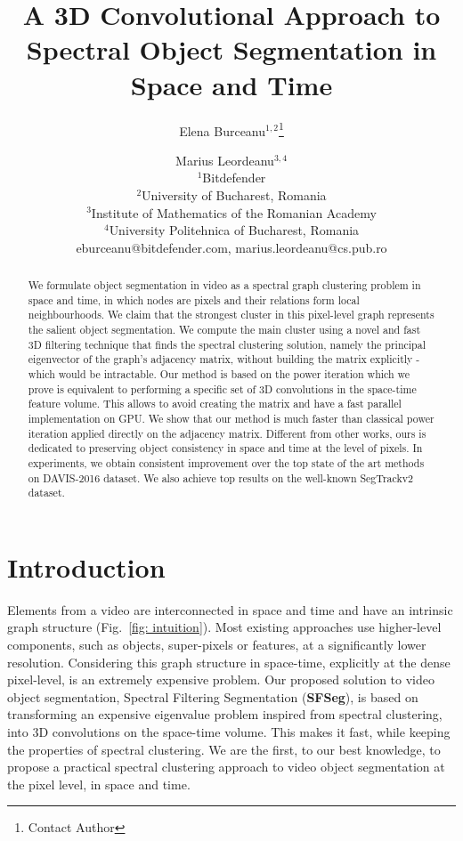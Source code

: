 \documentclass{article}
\title{A 3D Convolutional Approach to Spectral Object Segmentation in Space and Time}
\author{
Elena Burceanu$^{1,2}$\footnote{Contact Author}\and
Marius Leordeanu$^{3, 4}$\\
\affiliations
$^1$Bitdefender\\
$^2$University of Bucharest, Romania\\
$^3$Institute of Mathematics of the Romanian Academy\\
$^4$University Politehnica of Bucharest, Romania\\
\emails
eburceanu@bitdefender.com,
marius.leordeanu@cs.pub.ro
}
\begin{document}
\maketitle

\begin{abstract}
We formulate object segmentation in video as a spectral graph clustering problem in space and time, in which nodes are pixels and their relations form local neighbourhoods. We claim that the strongest cluster in this pixel-level graph represents the salient object segmentation. We compute the main cluster using a novel and fast 3D filtering technique that finds the spectral clustering solution, namely the principal eigenvector of the graph's adjacency matrix, without building the matrix explicitly - which would be intractable. Our method is based on the power iteration which we prove is equivalent to performing a specific set of 3D convolutions in the space-time feature volume. This allows to avoid creating the matrix and have a fast parallel implementation on GPU. We show that our method is much faster than classical power iteration applied directly on the adjacency matrix. Different from other works, ours is dedicated to preserving object consistency in space and time at the level of pixels. 
In experiments, we obtain consistent improvement over the top state of the art methods on DAVIS-2016 dataset. We also achieve top results on the well-known SegTrackv2 dataset.
\end{abstract}


\section{Introduction}
Elements from a video are interconnected in space and time and have an intrinsic graph structure (Fig.~\ref{fig: intuition}). Most existing approaches use higher-level components, such as objects, super-pixels or features, at a significantly lower resolution. Considering this graph structure in space-time, explicitly at the dense pixel-level, is an extremely expensive problem. Our proposed solution to video object segmentation, Spectral Filtering Segmentation (\textbf{SFSeg}), is based on transforming an expensive eigenvalue problem inspired from spectral clustering, into 3D convolutions on the space-time volume. This makes it fast, while keeping the properties of spectral clustering. We are the first, to our best knowledge, to propose a practical spectral clustering approach to video object segmentation at the pixel level, in space and time.
\end{document}
